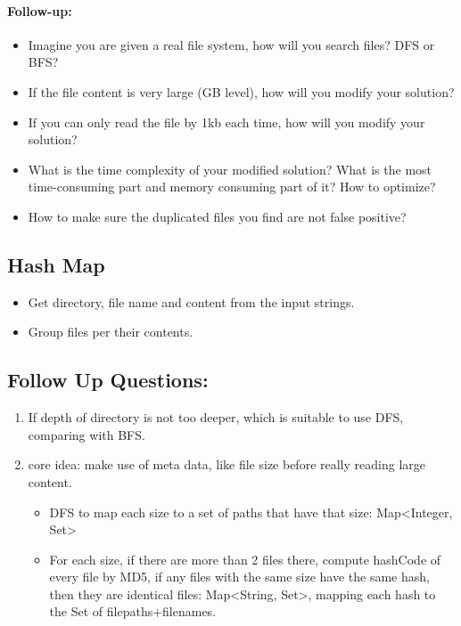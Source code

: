 
\paragraph{Follow-up:}

\begin{itemize}
\item Imagine you are given a real file system, how will you search files? DFS or BFS?
\item If the file content is very large (GB level), how will you modify your solution?
\item If you can only read the file by 1kb each time, how will you modify your solution?
\item What is the time complexity of your modified solution? What is the most time-consuming part and memory consuming part of it? How to optimize?
\item How to make sure the duplicated files you find are not false positive?
\end{itemize}

\subsection{Hash Map}
\begin{itemize}
    \item Get directory, file name and content from the input strings.
    \item Group files per their contents.
\end{itemize}

\subsection{Follow Up Questions:}
\begin{enumerate}
    \item If depth of directory is not too deeper, which is suitable to use DFS, comparing with BFS.
    \item core idea: make use of meta data, like file size before really reading large content. 
    \begin{itemize}
        \item  DFS to map each size to a set of paths that have that size: Map<Integer, Set>
    \item For each size, if there are more than 2 files there, compute hashCode of every file by MD5, if any files with the same size have the same hash, then they are identical files: Map<String, Set>, mapping each hash to the Set of filepaths+filenames. 
    \end{itemize}
\end{enumerate}
